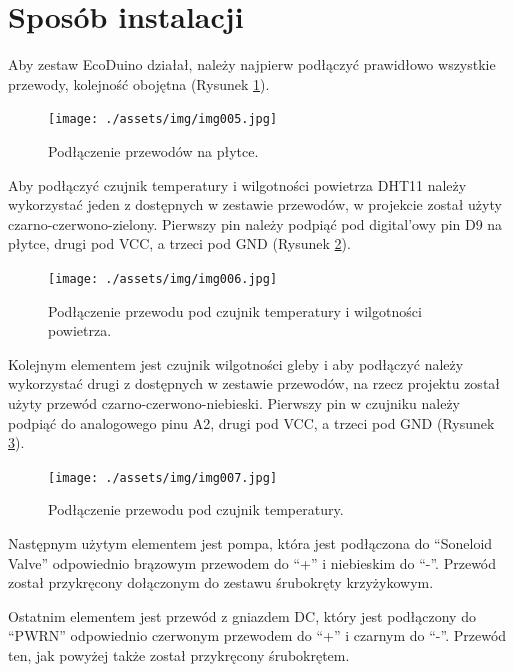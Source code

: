 \documentclass[a4paper,twoside,12pt]{book}
\begin{document}
\newpage

\section{Sposób instalacji}

Aby zestaw EcoDuino działał, należy najpierw podłączyć prawidłowo wszystkie przewody, kolejność obojętna (Rysunek \ref{fig:5}).

\begin{figure}[H]
   \centering
   \texttt{[image: ./assets/img/img005.jpg]}
   \caption{Podłączenie przewodów na płytce.}
   \label{fig:5}
\end{figure}

\newpage

Aby podłączyć czujnik temperatury i wilgotności powietrza DHT11 należy wykorzystać jeden z dostępnych w zestawie przewodów, w projekcie został użyty czarno-czerwono-zielony. Pierwszy pin należy podpiąć pod digital'owy pin D9 na płytce, drugi pod VCC, a trzeci pod GND (Rysunek \ref{fig:6}).

\begin{figure}[H]
   \centering
   \texttt{[image: ./assets/img/img006.jpg]}
   \caption{Podłączenie przewodu pod czujnik temperatury i wilgotności powietrza.}
   \label{fig:6}
\end{figure}

\newpage

Kolejnym elementem jest czujnik wilgotności gleby i aby podłączyć należy wykorzystać drugi z dostępnych w zestawie przewodów, na rzecz projektu został użyty przewód czarno-czerwono-niebieski. Pierwszy pin w czujniku należy podpiąć do analogowego pinu A2, drugi pod VCC, a trzeci pod GND (Rysunek \ref{fig:7}).

\begin{figure}[H]
   \centering
   \texttt{[image: ./assets/img/img007.jpg]}
   \caption{Podłączenie przewodu pod czujnik temperatury.}
   \label{fig:7}
\end{figure}

Następnym użytym elementem jest pompa, która jest podłączona do ``Soneloid Valve'' odpowiednio brązowym przewodem do ``+'' i niebieskim do ``-''. Przewód został przykręcony dołączonym do zestawu śrubokręty krzyżykowym.

Ostatnim elementem jest przewód z gniazdem DC, który jest podłączony do ``PWRN'' odpowiednio czerwonym przewodem do ``+'' i czarnym do ``-''. Przewód ten, jak powyżej także został przykręcony śrubokrętem.
\end{document}
